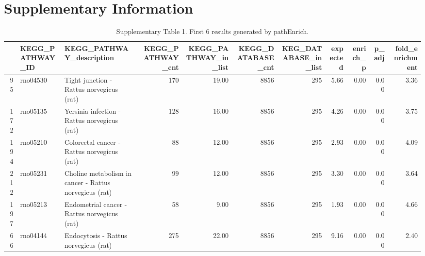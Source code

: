 \documentclass[article]{jss}\usepackage[]{graphicx}\usepackage[]{color}
\begin{document}
\section[Supplementary Information]{Supplementary Information} \label{sec:supinfo}



\begin{table}[H]
  \centering
  \caption{Supplementary Table 1. First 6 results generated by pathEnrich.}
  \tiny
  \begin{adjustbox}{width=\textwidth}
  \begin{tabular}{rllrrrrrrrr}
  \hline
 & KEGG\_PATHWAY\_ID & KEGG\_PATHWAY\_description & KEGG\_PATHWAY\_cnt & KEGG\_PATHWAY\_in\_list & KEGG\_DATABASE\_cnt & KEG\_DATABASE\_in\_list & expected & enrich\_p & p\_adj & fold\_enrichment \\
  \hline
95 & rno04530 & Tight junction - Rattus norvegicus (rat) & 170 & 19.00 & 8856 & 295 & 5.66 & 0.00 & 0.00 & 3.36 \\
  172 & rno05135 & Yersinia infection - Rattus norvegicus (rat) & 128 & 16.00 & 8856 & 295 & 4.26 & 0.00 & 0.00 & 3.75 \\
  194 & rno05210 & Colorectal cancer - Rattus norvegicus (rat) &  88 & 12.00 & 8856 & 295 & 2.93 & 0.00 & 0.00 & 4.09 \\
  212 & rno05231 & Choline metabolism in cancer - Rattus norvegicus (rat) &  99 & 12.00 & 8856 & 295 & 3.30 & 0.00 & 0.00 & 3.64 \\
  197 & rno05213 & Endometrial cancer - Rattus norvegicus (rat) &  58 & 9.00 & 8856 & 295 & 1.93 & 0.00 & 0.00 & 4.66 \\
  66 & rno04144 & Endocytosis - Rattus norvegicus (rat) & 275 & 22.00 & 8856 & 295 & 9.16 & 0.00 & 0.00 & 2.40 \\
   \hline
  \end{tabular}
\end{adjustbox}
\end{table}
\end{document}
